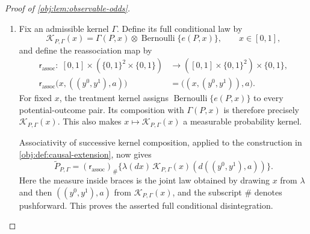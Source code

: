 \begin{proof}[Proof of \cref{obj:lem:observable-odds}]
\begin{enumerate}
\item Fix an admissible kernel \(\Gamma\). Define its full conditional law by
\[
\mathcal K_{P,\Gamma}(x)
=\Gamma(P,x)\otimes\operatorname{Bernoulli}\{e(P,x)\},
\qquad x\in[0,1],
\]
and define the reassociation map by
\[
\begin{aligned}
\mathsf r_{\mathrm{assoc}}:\;
[0,1]\times(\{0,1\}^2\times\{0,1\})
&\longrightarrow([0,1]\times\{0,1\}^2)\times\{0,1\},\\
\mathsf r_{\mathrm{assoc}}\bigl(x,((y^0,y^1),a)\bigr)
&=\bigl((x,(y^0,y^1)),a\bigr).
\end{aligned}
\]
For fixed \(x\), the treatment kernel assigns
\(\operatorname{Bernoulli}\{e(P,x)\}\) to every potential-outcome pair. Its composition with \(\Gamma(P,x)\) is therefore precisely \(\mathcal K_{P,\Gamma}(x)\). This also makes \(x\mapsto\mathcal K_{P,\Gamma}(x)\) a measurable probability kernel.

Associativity of successive kernel composition, applied to the construction in \cref{obj:def:causal-extension}, now gives
\[
\widetilde P_{P,\Gamma}
=(\mathsf r_{\mathrm{assoc}})_\#
 \bigl\{\lambda(dx)\,
 \mathcal K_{P,\Gamma}(x)(d((y^0,y^1),a))\bigr\}.
\]
Here the measure inside braces is the joint law obtained by drawing \(x\) from \(\lambda\) and then \(((y^0,y^1),a)\) from \(\mathcal K_{P,\Gamma}(x)\), and the subscript \(\#\) denotes pushforward. This proves the asserted full conditional disintegration.


\end{enumerate}
\end{proof}
